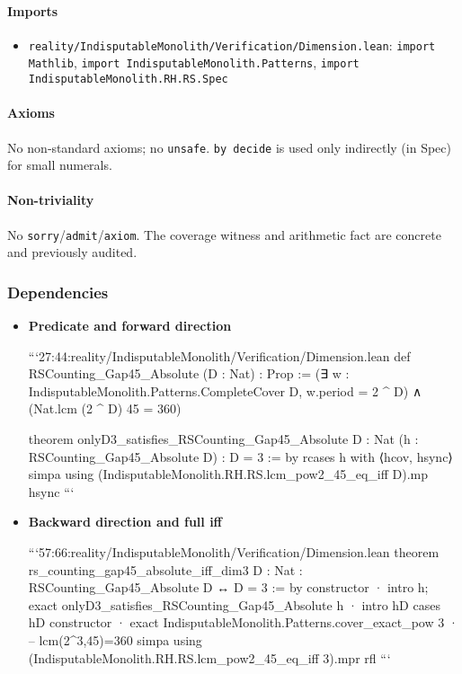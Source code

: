 \documentclass{article}
\newcommand{\FileRef}[1]{\texttt{#1}}
\begin{document}
\paragraph{Imports}
\begin{itemize}[leftmargin=*]
  \item \FileRef{reality/IndisputableMonolith/Verification/Dimension.lean}: \texttt{import Mathlib}, \texttt{import IndisputableMonolith.Patterns}, \texttt{import IndisputableMonolith.RH.RS.Spec}
\end{itemize}

\paragraph{Axioms}
No non‑standard axioms; no \texttt{unsafe}. \texttt{by decide} is used only indirectly (in Spec) for small numerals.

\paragraph{Non-triviality}
No \texttt{sorry}/\texttt{admit}/\texttt{axiom}. The coverage witness and arithmetic fact are concrete and previously audited.

\subsubsection{Dependencies}
\begin{itemize}[leftmargin=*]
  \item \textbf{Predicate and forward direction}

```27:44:reality/IndisputableMonolith/Verification/Dimension.lean
def RSCounting_Gap45_Absolute (D : Nat) : Prop :=
  (∃ w : IndisputableMonolith.Patterns.CompleteCover D, w.period = 2 ^ D)
  ∧ (Nat.lcm (2 ^ D) 45 = 360)

theorem onlyD3_satisfies_RSCounting_Gap45_Absolute {D : Nat}
  (h : RSCounting_Gap45_Absolute D) : D = 3 := by
  rcases h with ⟨hcov, hsync⟩
  simpa using (IndisputableMonolith.RH.RS.lcm_pow2_45_eq_iff D).mp hsync
```

  \item \textbf{Backward direction and full iff}

```57:66:reality/IndisputableMonolith/Verification/Dimension.lean
theorem rs_counting_gap45_absolute_iff_dim3 {D : Nat} :
  RSCounting_Gap45_Absolute D ↔ D = 3 := by
  constructor
  · intro h; exact onlyD3_satisfies_RSCounting_Gap45_Absolute h
  · intro hD
    cases hD
    constructor
    · exact IndisputableMonolith.Patterns.cover_exact_pow 3
    · -- lcm(2^3,45)=360
      simpa using (IndisputableMonolith.RH.RS.lcm_pow2_45_eq_iff 3).mpr rfl
```
\end{itemize}
\end{document}
